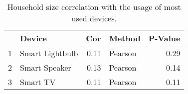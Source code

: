 \begin{table}[ht]
\centering
\begin{tabular}{rlrlr}
  \hline
 & Device & Cor & Method & P-Value \\ 
  \hline
1 & Smart Lightbulb & 0.11 & Pearson & 0.29 \\ 
  2 & Smart Speaker & 0.13 & Pearson & 0.14 \\ 
  3 & Smart TV & 0.11 & Pearson & 0.11 \\ 
   \hline
\end{tabular}
\caption{Household size correlation with the usage of most used devices.} 
\end{table}
